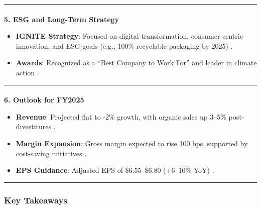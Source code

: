 \documentclass[
  letterpaper,
  DIV=11,
  numbers=noendperiod]{scrartcl}
\makeatletter
\let\oldparagraph\paragraph
\renewcommand{\paragraph}{
    \@ifstar
      \xxxParagraphStar
      \xxxParagraphNoStar
  }
\newcommand{\xxxParagraphStar}[1]{\oldparagraph*{#1}\mbox{}}
\newcommand{\xxxParagraphNoStar}[1]{\oldparagraph{#1}\mbox{}}
\providecommand{\tightlist}{%
  \setlength{\itemsep}{0pt}\setlength{\parskip}{0pt}}\usepackage{longtable,booktabs,array}
\makeatother
\begin{document}
\begin{center}\rule{0.5\linewidth}{0.5pt}\end{center}

\paragraph{\texorpdfstring{\textbf{5. ESG and Long-Term
Strategy}}{5. ESG and Long-Term Strategy}}\label{esg-and-long-term-strategy}

\begin{itemize}
\tightlist
\item
  \textbf{IGNITE Strategy}: Focused on digital transformation,
  consumer-centric innovation, and ESG goals (e.g., 100\% recyclable
  packaging by 2025) .\\
\item
  \textbf{Awards}: Recognized as a ``Best Company to Work For'' and
  leader in climate action .
\end{itemize}

\begin{center}\rule{0.5\linewidth}{0.5pt}\end{center}

\paragraph{\texorpdfstring{\textbf{6. Outlook for
FY2025}}{6. Outlook for FY2025}}\label{outlook-for-fy2025}

\begin{itemize}
\tightlist
\item
  \textbf{Revenue}: Projected flat to -2\% growth, with organic sales up
  3--5\% post-divestitures .\\
\item
  \textbf{Margin Expansion}: Gross margin expected to rise 100 bps,
  supported by cost-saving initiatives .\\
\item
  \textbf{EPS Guidance}: Adjusted EPS of \$6.55--\$6.80 (+6--10\% YoY) .
\end{itemize}

\begin{center}\rule{0.5\linewidth}{0.5pt}\end{center}

\subsubsection{\texorpdfstring{\textbf{Key
Takeaways}}{Key Takeaways}}\label{key-takeaways}
\end{document}

